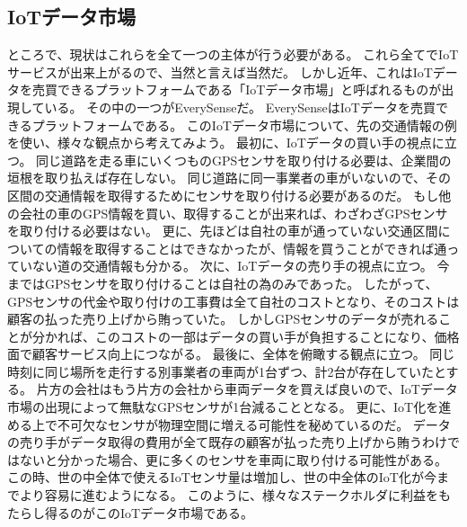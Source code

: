 \subsection{IoTデータ市場}
ところで、現状はこれらを全て一つの主体が行う必要がある。
これら全てでIoTサービスが出来上がるので、当然と言えば当然だ。
しかし近年、これはIoTデータを売買できるプラットフォームである「IoTデータ市場」と呼ばれるものが出現している。
その中の一つがEverySense\cite{everysense}だ。
EverySenseはIoTデータを売買できるプラットフォームである。
このIoTデータ市場について、先の交通情報の例を使い、様々な観点から考えてみよう。
最初に、IoTデータの買い手の視点に立つ。
同じ道路を走る車にいくつものGPSセンサを取り付ける必要は、企業間の垣根を取り払えば存在しない。
同じ道路に同一事業者の車がいないので、その区間の交通情報を取得するためにセンサを取り付ける必要があるのだ。
もし他の会社の車のGPS情報を買い、取得することが出来れば、わざわざGPSセンサを取り付ける必要はない。
更に、先ほどは自社の車が通っていない交通区間についての情報を取得することはできなかったが、情報を買うことができれば通っていない道の交通情報も分かる。
次に、IoTデータの売り手の視点に立つ。
今まではGPSセンサを取り付けることは自社の為のみであった。
したがって、GPSセンサの代金や取り付けの工事費は全て自社のコストとなり、そのコストは顧客の払った売り上げから賄っていた。
しかしGPSセンサのデータが売れることが分かれば、このコストの一部はデータの買い手が負担することになり、価格面で顧客サービス向上につながる。
最後に、全体を俯瞰する観点に立つ。
同じ時刻に同じ場所を走行する別事業者の車両が1台ずつ、計2台が存在していたとする。
片方の会社はもう片方の会社から車両データを買えば良いので、IoTデータ市場の出現によって無駄なGPSセンサが1台減ることとなる。
更に、IoT化を進める上で不可欠なセンサが物理空間に増える可能性を秘めているのだ。
データの売り手がデータ取得の費用が全て既存の顧客が払った売り上げから賄うわけではないと分かった場合、更に多くのセンサを車両に取り付ける可能性がある。
この時、世の中全体で使えるIoTセンサ量は増加し、世の中全体のIoT化が今までより容易に進むようになる。
このように、様々なステークホルダに利益をもたらし得るのがこのIoTデータ市場である。


